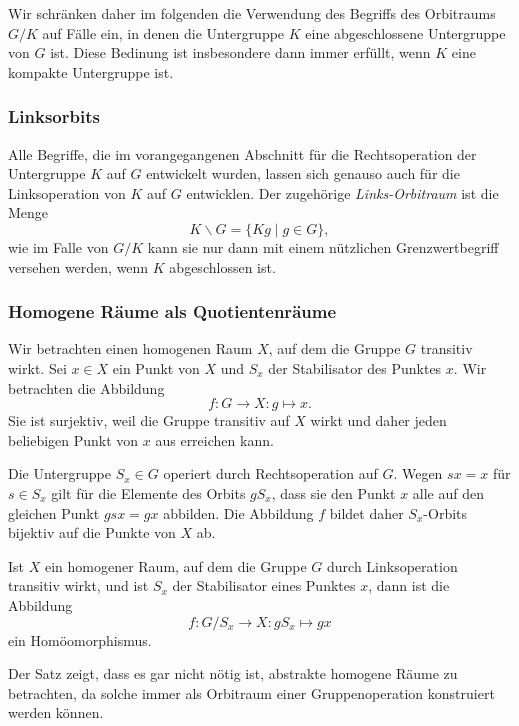 Wir schränken daher im folgenden die Verwendung des Begriffs des
Orbitraums $G/K$ auf Fälle ein, in denen die Untergruppe $K$ eine
abgeschlossene Untergruppe von $G$ ist.
Diese Bedinung ist insbesondere dann immer erfüllt, wenn $K$ eine
kompakte Untergruppe ist.

%
%
\subsubsection{Linksorbits}
Alle Begriffe, die im vorangegangenen Abschnitt für die Rechtsoperation
der Untergruppe $K$ auf $G$ entwickelt wurden, lassen sich genauso
auch für die Linksoperation von $K$ auf $G$ entwicklen.
Der zugehörige {\em Links-Orbitraum} ist die Menge
\[
K\backslash G
=
\{ Kg \mid g\in G \},
\]
wie im Falle von $G/K$ kann sie nur dann mit einem nützlichen
Grenzwertbegriff versehen werden, wenn $K$ abgeschlossen ist.

%
%
\subsubsection{Homogene Räume als Quotientenräume}
Wir betrachten einen homogenen Raum $X$, auf dem die Gruppe $G$
transitiv wirkt.
Sei $x\in X$ ein Punkt von $X$ und $S_x$ der Stabilisator des
Punktes $x$.
Wir betrachten die Abbildung
\[
f
\colon
G\to X
:
g \mapsto x.
\]
Sie ist surjektiv, weil die Gruppe transitiv auf $X$ wirkt und
daher jeden beliebigen Punkt von $x$ aus erreichen kann.

Die Untergruppe $S_x\in G$ operiert durch Rechtsoperation auf $G$.
Wegen $sx=x$ für $s\in S_x$ gilt für die Elemente des Orbits
$gS_x$, dass sie den Punkt $x$ alle auf den gleichen Punkt
\(
gsx = gx
\)
abbilden.
Die Abbildung $f$ bildet daher $S_x$-Orbits bijektiv auf die
Punkte von $X$ ab.

\begin{satz}
\label{buch:nichtkomm:homogen:satz:homorbitraum}
Ist $X$ ein homogener Raum, auf dem die Gruppe $G$ durch Linksoperation
transitiv wirkt, und ist $S_x$ der Stabilisator eines Punktes $x$, dann
ist die Abbildung
\[
f
\colon
G/S_x \to  X
:
gS_x \mapsto gx
\]
ein Homöomorphismus.
\end{satz}

Der Satz zeigt, dass es gar nicht nötig ist, abstrakte homogene Räume
zu betrachten, da solche immer als Orbitraum einer Gruppenoperation 
konstruiert werden können.

